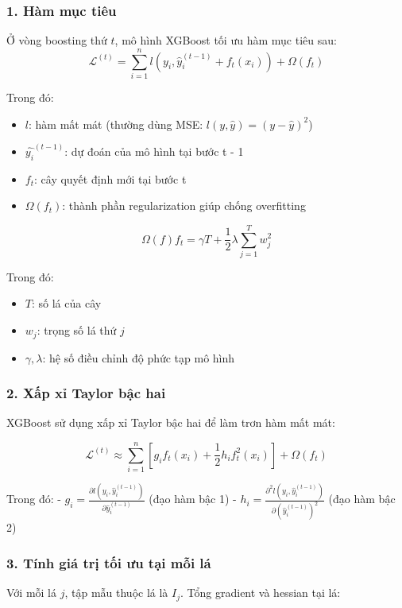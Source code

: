 \subsubsection*{1. Hàm mục tiêu}

Ở vòng boosting thứ \( t \), mô hình XGBoost tối ưu hàm mục tiêu sau:
\[
\mathcal{L}^{(t)} = \sum_{i=1}^{n} l(y_i, \hat{y}_i^{(t-1)} + f_t(x_i)) + \Omega(f_t)
\]

Trong đó:
\begin{itemize}
	\item \( l \): hàm mất mát (thường dùng MSE: \( l(y, \hat{y}) = (y - \hat{y})^2 \))
	\item \(\hat{y_i}^{(t-1)}\): dự đoán của mô hình tại bước t - 1
	\item \(f_t\): cây quyết định mới tại bước t
	\item \( \Omega(f_t) \): thành phần regularization giúp chống overfitting
\end{itemize}

\[\Omega(f)f_t  = \gamma T + \frac{1}{2} \lambda \sum_{j=1}^{T} w_j^2 \]

Trong đó:
\begin{itemize}
	\item \(T\): số lá của cây
	\item \(w_j\): trọng số lá thứ \(j\)
	\item \(\gamma, \lambda\): hệ số điều chỉnh độ phức tạp mô hình
\end{itemize}
\subsubsection*{2. Xấp xỉ Taylor bậc hai}

XGBoost sử dụng xấp xỉ Taylor bậc hai để làm trơn hàm mất mát:

\[
\mathcal{L}^{(t)} \approx \sum_{i=1}^{n} \left[ g_i f_t(x_i) + \frac{1}{2} h_i f_t^2(x_i) \right] + \Omega(f_t)
\]

Trong đó:
- \( g_i = \frac{\partial l(y_i, \hat{y}_i^{(t-1)})}{\partial \hat{y}_i^{(t-1)}} \) (đạo hàm bậc 1)
- \( h_i = \frac{\partial^2 l(y_i, \hat{y}_i^{(t-1)})}{\partial (\hat{y}_i^{(t-1)})^2} \) (đạo hàm bậc 2)

\subsubsection*{3. Tính giá trị tối ưu tại mỗi lá}

Với mỗi lá \( j \), tập mẫu thuộc lá là \( I_j \). Tổng gradient và hessian tại lá:

